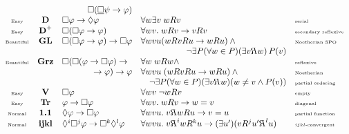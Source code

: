 \documentclass[xcolor=x11names]{beamer}
\newcommand{\bemph}[1] {{\color{DeepSkyBlue3}{#1}}}
\newcommand{\lthen}{\rightarrow}
\newcommand{\forallin}[2]{(\forall #1 \in #2)}
\newcommand{\existsp}[1]{(\exists #1)}
\begin{document}
\begin{frame}
\[\begin{array}{cclll}
\\ && \hfill \Box (\underline{\Box} \psi \lthen \varphi)
\\ \textup{\tiny Easy}& \textbf {D} & \Box \varphi \lthen \Diamond \varphi &\forall {w}\exists{v}\; wRv&\textup{\tiny serial}
\\ \textup{\tiny Easy}& \textbf {D}^+ & \Box (\Box \varphi \lthen \varphi) &\forall {wv}.\; wRv\lthen vRv &\textup{\tiny secondary reflexive}
\\ \textup{\tiny Beautiful}& \textbf {GL} & \Box (\Box \varphi \lthen \varphi) \lthen \Box \varphi
& \forall {wvu} (wRvRu\lthen wRu) \land{}&\textup{\tiny Noetherian SPO}
\\& &&\hfill \lnot \exists P \forallin wP \existsp {v\reflectbox {$R$} w} \, P(v)&%
\\ \textup{\tiny Beautiful}& \textbf {Grz} & \Box (\Box (\varphi \lthen \Box \varphi) \lthen  & \forall {w}\; wRw\land&\textup{\tiny reflexive}
\\& &\hfill \lthen \varphi) \lthen \varphi& \forall {wvu}\; (wRvRu\lthen wRu ) \land{} &\textup{\tiny Noetherian}
\\& &&\quad \lnot \exists P \forallin w P\existsp {v\reflectbox {$R$}w} (w\neq v \land P(v))&\textup{\tiny partial ordering}
\\ \textup{\tiny Easy}& \textbf {V} & \Box \varphi &\forall {wv} \; \lnot wRv&\textup{\tiny empty}
\\ \textup{\tiny Easy}& \textbf {Tr} & \varphi \lthen \Box \varphi &\forall {wv}. \;wRv\lthen w=v &\textup{\tiny diagonal}
\\ \textup{\tiny Normal}& \textbf {1.1} & \Diamond \varphi \lthen \Box \varphi &\forall {wvu}. \; v\reflectbox {$R$}wRu \lthen v=u&\textup{\tiny partial function}
\\ \textup{\tiny Normal}& \textbf {ijkl} & \Diamond ^i\Box ^j\varphi \lthen \Box^k \Diamond^l\varphi &\forall {wvu}.\;v\reflectbox {$R$}^iwR^ku\lthen  \existsp{u'} (vR^ju'\reflectbox {$R$}^lu)&\textup{\tiny $ijkl$-convergent}
\end{array}\]


\end{frame}

\end{document}
